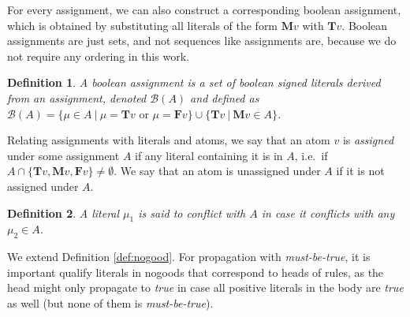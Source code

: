 \documentclass{vutinfth} %
\newtheorem{definition}{Definition}[chapter]
\newcommand{\mbt}{must-be-true\xspace}
\newcommand{\bass}{\mathcal{B}}
\newcommand{\ass}{A}
\newcommand{\bT}{\mathbf{T}}
\newcommand{\bM}{\mathbf{M}}
\newcommand{\bF}{\mathbf{F}}
\newcommand{\bX}{\mathbf{X}}
\newcommand{\sgl}{\mu}
\begin{document}


For every assignment, we can also construct a corresponding boolean assignment, which is obtained by substituting all literals of the form $\bM v$ with $\bT v$. Boolean assignments are just sets, and not sequences like assignments are, because we do not require any ordering in this work.

\begin{definition}
A \emph{boolean assignment} is a set of boolean signed literals derived from an assignment, denoted $\bass(\ass)$ and defined as $\bass(\ass) = \{ \sgl \in \ass \ | \ \sgl = \bT v \textrm{ or } \sgl = \bF v \} \cup \{ \bT v \ | \ \bM v \in \ass \}$.
\end{definition}

Relating assignments with literals and atoms, we say that an atom $v$ is \emph{assigned} under some assignment $\ass$ if any literal containing it is in $\ass$, i.e.~if $\ass \cap \{\bT v, \bM v, \bF v \} \not = \emptyset$. We say that an atom is unassigned under $A$ if it is not assigned under $A$.




\begin{definition}
A literal $\sgl_1$ is said to conflict with $\ass$ in case it conflicts with any $\sgl_2 \in \ass$.
\end{definition}

We extend Definition \ref{def:nogood}. For propagation with \emph{\mbt}, it is important qualify literals in nogoods that correspond to heads of rules, as the head might only propagate to \emph{true} in case all positive literals in the body are \emph{true} as well (but none of them is \emph{\mbt}).
\end{document}
